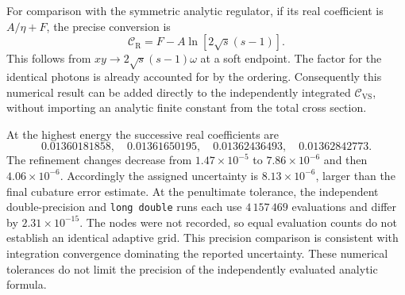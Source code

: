For comparison with the symmetric analytic regulator, if its real
coefficient is $A/\eta+F$, the precise conversion is
\begin{equation}
 \mathcal C_{\mathrm R}=F-A\ln[2\sqrt{s}(s-1)].
\end{equation}
This follows from $xy\to2\sqrt{s}(s-1)\omega$ at a soft endpoint.
The factor for the identical photons is already accounted for by
the ordering. Consequently this numerical result can be added
directly to the independently integrated
$\mathcal C_{\mathrm{VS}}$, without importing an analytic finite
constant from the total cross section.

At the highest energy the successive real coefficients are
\begin{equation}
 0.01360181858,\quad 0.01361650195,\quad
 0.01362436493,\quad 0.01362842773.
\end{equation}
The refinement changes decrease from $1.47\times10^{-5}$ to
$7.86\times10^{-6}$ and then $4.06\times10^{-6}$. Accordingly the
assigned uncertainty is $8.13\times10^{-6}$, larger than the final
cubature error estimate. At the penultimate tolerance, the independent
double-precision and \texttt{long double} runs each use
$4\,157\,469$ evaluations and differ by $2.31\times10^{-15}$.
The nodes were not recorded, so equal evaluation counts do not
establish an identical adaptive grid. This precision comparison is
consistent with integration convergence dominating the reported
uncertainty. These numerical tolerances do not limit the precision
of the independently evaluated analytic formula.
